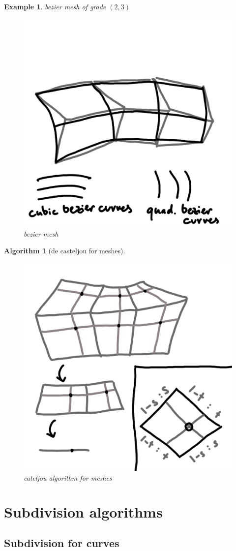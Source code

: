 \documentclass[]{article}
\newtheorem{algorithm}{Algorithm}
\newtheorem{example}{Example}
\begin{document}
\begin{example}
	bezier mesh of grade $(2,3)$
	
	\begin{figure}[h!]
		\centering
		\includegraphics[width=0.3\linewidth]{figures/bezier_mesh}
		\caption{bezier mesh}
		\label{fig:bezier_mesh}
	\end{figure}
\end{example}

\begin{algorithm}[de casteljou for meshes]
	\begin{figure}[h!]
		\centering
		\includegraphics[width=0.3\linewidth]{figures/decasteljou_mesh}
		\caption{cateljou algorithm for meshes}
		\label{fig:decasteljou_mesh}
	\end{figure}
\end{algorithm}

\section{Subdivision algorithms}

\subsection{Subdivision for curves}
\end{document}

